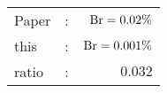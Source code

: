      \begin{tabular}{lcr}
          Paper &:& $\mathrm{Br}  = 0.02\%$ \\
          this      &:& $\mathrm{Br}  = 0.001\%$ \\
		  ratio   &:& $0.032$ \\
      \end{tabular}
